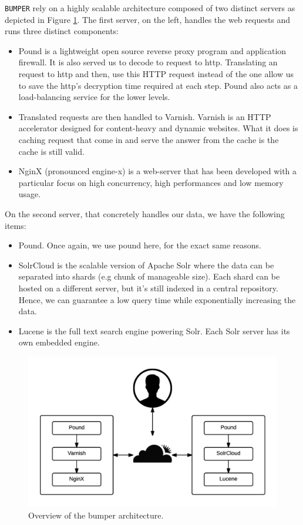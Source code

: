 {\tt BUMPER} rely on a highly scalable architecture composed of two distinct servers as depicted in Figure \ref{fig:bumper-arch}. The first server, on the left, handles the web requests and runs three distinct components:

\begin{itemize}
	\item Pound is a lightweight open source reverse proxy program and application firewall.
	It is also served us to decode  to request to http. Translating an  request to http and then, use this HTTP request instead of the  one allow us to save the http's decryption time required at each step.
	Pound also acts as a load-balancing service for the lower levels.
	\item Translated requests are then handled to Varnish. Varnish is an HTTP accelerator designed for content-heavy and dynamic websites. What it does is caching request that come in and serve the answer from the cache is the cache is still valid.
	\item NginX (pronounced engine-x) is a web-server that has been developed with a particular focus on high concurrency, high performances and low memory usage.
\end{itemize}

On the second server, that concretely handles our data, we have the following items:

\begin{itemize}
	\item Pound. Once again, we use pound here, for the exact same reasons.
	\item SolrCloud is the scalable version of Apache Solr where the data can be separated into shards (e.g chunk of manageable size). Each shard can be hosted on a different server, but it's still indexed in a central repository. Hence, we can guarantee a low query time while exponentially increasing the data.
	\item Lucene is the full text search engine powering Solr. Each Solr server has its own embedded engine.
\end{itemize}

\begin{figure}[h!]
  \centering
    \includegraphics{media/bumper-arch.png}
    \caption{Overview of the bumper architecture.
    \label{fig:bumper-arch}}
\end{figure}

